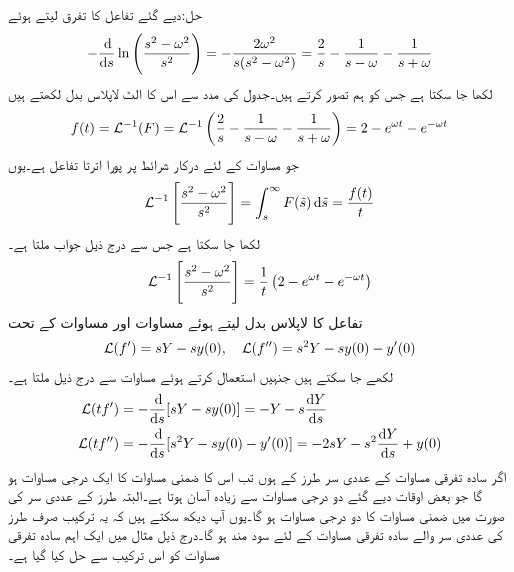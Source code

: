 حل:دیے گئے تفاعل کا تفرق لیتے ہوئے
\begin{align*}
-\frac{\dif}{\dif s}\ln\left(\frac{s^2-\omega^2}{s^2}\right)=-\frac{2\omega^2}{s(s^2-\omega^2)}=\frac{2}{s}-\frac{1}{s-\omega}-\frac{1}{s+\omega}
\end{align*}
لکھا جا سکتا ہے جس کو ہم  تصور کرتے ہیں۔جدول  کی مدد سے اس کا الٹ لاپلاس بدل لکھتے ہیں
\begin{align*}
f(t)=\mathcal{L}^{-1}(F)=\mathcal{L}^{-1}\left(\frac{2}{s}-\frac{1}{s-\omega}-\frac{1}{s+\omega}\right)=2-e^{\omega t}-e^{-\omega t}
\end{align*} 
جو مساوات  کے لئے درکار شرائط پر پورا اترتا تفاعل ہے۔یوں
\begin{align*}
\Laplace^{-1}\left[\frac{s^2-\omega^2}{s^2}\right]=\int_{s}^{\infty}F(\tilde{s})\dif \tilde{s}=\frac{f(t)}{t}
\end{align*}
لکھا جا سکتا ہے جس سے درج ذیل جواب ملتا ہے۔
\begin{align*}
\mathcal{L}^{-1}\left[\frac{s^2-\omega^2}{s^2}\right]=\frac{1}{t}\left(2-e^{\omega t}-e^{-\omega t}\right)
\end{align*}
تفاعل  کا لاپلاس بدل  لیتے ہوئے مساوات  اور مساوات  کے تحت
\begin{align*}
\mathcal{L}(f')=sY-sy(0),\quad \mathcal{L}(f'')=s^2Y-sy(0)-y'(0)
\end{align*}
لکھے جا سکتے ہیں جنہیں استعمال کرتے ہوئے مساوات  سے درج ذیل ملتا ہے۔
\begin{gather}
\begin{aligned}\label{مساوات_لاپلاس_لاگیغ_الف}
\Laplace(tf')&=-\frac{\dif}{\dif s}[sY-sy(0)]=-Y-s\frac{\dif Y}{\dif s}\\
\Laplace(tf'')&=-\frac{\dif}{\dif s}[s^2Y-sy(0)-y'(0)]=-2sY-s^2\frac{\dif Y}{\dif s}+y(0)
\end{aligned}
\end{gather}
اگر سادہ تفرقی مساوات کے عددی سر  طرز کے ہوں تب اس کا ضمنی مساوات  کا ایک درجی مساوات ہو گا جو بعض اوقات دیے گئے دو درجی مساوات سے زیادہ آسان ہوتا ہے۔البتہ  طرز کے عددی سر کی صورت میں ضمنی مساوات  کا دو درجی مساوات ہو گا۔یوں آپ دیکھ سکتے ہیں کہ یہ ترکیب صرف  طرز کی عددی سر والے سادہ تفرقی مساوات کے لئے سود مند ہو گا۔درج ذیل مثال میں ایک اہم سادہ تفرقی مساوات کو اس ترکیب سے حل کیا گیا ہے۔
